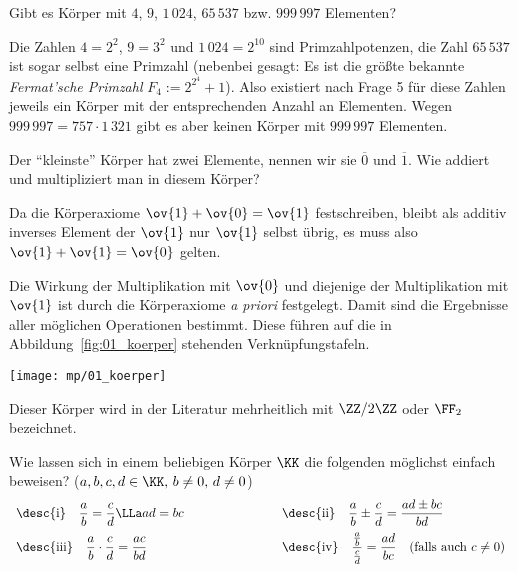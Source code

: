 \begin{frage} 
  Gibt es Körper mit $4$, $9$, $1\,024$, $65\,537$ bzw. $999\,997$ Elementen?
\end{frage}

\begin{antwort}
  Die Zahlen $4=2^2$, $9=3^2$ und $1\,024=2^{10}$ sind Primzahlpotenzen, 
  die Zahl $65\,537$ ist sogar selbst eine Primzahl 
  (nebenbei gesagt: Es ist die größte bekannte 
  \textit{Fermat'sche Primzahl} $F_4 := 2^{2^4}+1$).
  Also existiert nach 
  Frage 5 für diese Zahlen jeweils ein Körper mit der entsprechenden Anzahl 
  an Elementen. 
  Wegen $999\,997=757\cdot 1\,321$ gibt es 
  aber keinen Körper mit $999\,997$ Elementen.
  \AntEnd
\end{antwort}


\begin{frage}
  Der "`kleinste"' Körper hat zwei Elemente, 
  nennen wir sie 
  $\overline{0}$ und $\overline{1}$. Wie addiert und multipliziert man 
  in diesem Körper?
\end{frage}

\begin{antwort}
  Da die Körperaxiome $\ov{1}+\ov{0}=\ov{1}$ festschreiben, bleibt als 
  additiv inverses Element der $\ov{1}$ nur $\ov{1}$ selbst übrig, es 
  muss also $\ov{1}+\ov{1}=\ov{0}$ gelten. 

  Die Wirkung der Multiplikation mit $\ov{0}$ und diejenige 
  der Multiplikation mit $\ov{1}$ ist durch die Körperaxiome 
  \textit{a priori} festgelegt. 
  Damit sind die Ergebnisse aller möglichen Operationen 
  bestimmt. Diese führen auf die in Abbildung~\ref{fig:01_koerper} 
  stehenden Verknüpfungstafeln.
  \AntEnd

  \begin{center}
    \texttt{[image: mp/01\_koerper]}
    \label{fig:01_koerper}
  \end{center}

  Dieser Körper wird in der Literatur mehrheitlich mit $\ZZ/2\ZZ$ oder $\FF_2$ bezeichnet.
\end{antwort}


\begin{frage} 
  Wie lassen sich in einem beliebigen Körper $\KK$ die folgenden 
  möglichst einfach beweisen? 
  ($a,b,c,d \in \KK, \, b\not=0, \, d\not=0$)
  \[
  \begin{array}{lcl}
    \displaystyle \text{\desc{i}}\quad
    \frac{a}{b} = \frac{c}{d} \LLa ad = bc & \rule{20mm}{0mm} &
    \displaystyle \text{\desc{ii}}\quad
    \frac{a}{b} \pm \frac{c}{d} = \frac{ad \pm bc}{bd} \\[3mm]
    \displaystyle \text{\desc{iii}}\quad
    \frac{a}{b}\cdot \frac{c}{d} = \frac{ac}{bd}  & \rule{20mm}{0mm} &
    \displaystyle \text{\desc{iv}}\quad
    \frac{  \frac{a}{b} }{ \frac{c}{d} } = \frac{ad}{bc} 
    \quad (\text{falls auch $c\not=0$})
  \end{array}
  \] 
\end{frage}


